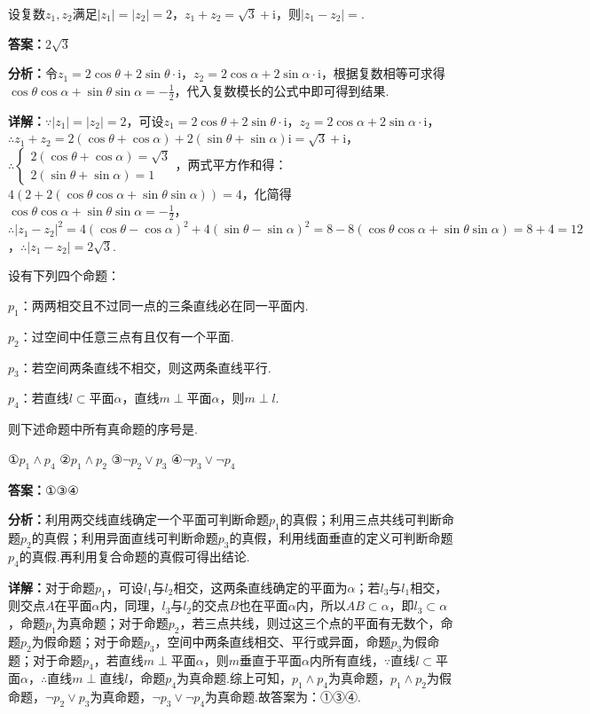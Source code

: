 \begin{question}[points=5]
设复数$z_1,z_2$满足$|z_1|=|z_2|=2$，$z_1+z_2=\sqrt3+\mathrm{i}$，则$|z_1-z_2|=$.
\fillin[{$2\sqrt3$}]
\begin{solution}
\textbf{答案：}$2\sqrt3$

\textbf{分析：}令$z_1=2\cos\theta+2\sin\theta\cdot\mathrm{i}$，$z_2=2\cos\alpha+2\sin\alpha\cdot\mathrm{i}$，根据复数相等可求得$\cos\theta\cos\alpha+\sin\theta\sin\alpha=-\frac12$，代入复数模长的公式中即可得到结果.

\textbf{详解：}$\because|z_1|=|z_2|=2$，可设$z_1=2\cos\theta+2\sin\theta\cdot\mathrm{i}$，$z_2=2\cos\alpha+2\sin\alpha\cdot\mathrm{i}$，$\therefore z_1+z_2=2(\cos\theta+\cos\alpha)+2(\sin\theta+\sin\alpha)\mathrm{i}=\sqrt3+\mathrm{i}$，$\therefore\begin{cases}2(\cos\theta+\cos\alpha)=\sqrt3\\2(\sin\theta+\sin\alpha)=1\end{cases}$，两式平方作和得：$4(2+2(\cos\theta\cos\alpha+\sin\theta\sin\alpha))=4$，化简得$\cos\theta\cos\alpha+\sin\theta\sin\alpha=-\frac12$，$\therefore|z_1-z_2|^2=4(\cos\theta-\cos\alpha)^2+4(\sin\theta-\sin\alpha)^2=8-8(\cos\theta\cos\alpha+\sin\theta\sin\alpha)=8+4=12$，$\therefore|z_1-z_2|=2\sqrt3$.
\end{solution}
\end{question}

\begin{question}[points=5]
设有下列四个命题：

$p_1$：两两相交且不过同一点的三条直线必在同一平面内.

$p_2$：过空间中任意三点有且仅有一个平面.

$p_3$：若空间两条直线不相交，则这两条直线平行.

$p_4$：若直线$l\subset$平面$\alpha$，直线$m\perp$平面$\alpha$，则$m\perp l$.

则下述命题中所有真命题的序号是.

①$p_1\land p_4$ ②$p_1\land p_2$ ③$\lnot p_2\lor p_3$ ④$\lnot p_3\lor\lnot p_4$
\fillin[{$①③④$}]
\begin{solution}
\textbf{答案：}$①③④$

\textbf{分析：}利用两交线直线确定一个平面可判断命题$p_1$的真假；利用三点共线可判断命题$p_2$的真假；利用异面直线可判断命题$p_3$的真假，利用线面垂直的定义可判断命题$p_4$的真假.再利用复合命题的真假可得出结论.

\textbf{详解：}对于命题$p_1$，可设$l_1$与$l_2$相交，这两条直线确定的平面为$\alpha$；若$l_3$与$l_1$相交，则交点$A$在平面$\alpha$内，同理，$l_3$与$l_2$的交点$B$也在平面$\alpha$内，所以$AB\subset\alpha$，即$l_3\subset\alpha$，命题$p_1$为真命题；对于命题$p_2$，若三点共线，则过这三个点的平面有无数个，命题$p_2$为假命题；对于命题$p_3$，空间中两条直线相交、平行或异面，命题$p_3$为假命题；对于命题$p_4$，若直线$m\perp$平面$\alpha$，则$m$垂直于平面$\alpha$内所有直线，$\because$直线$l\subset$平面$\alpha$，$\therefore$直线$m\perp$直线$l$，命题$p_4$为真命题.综上可知，$p_1\land p_4$为真命题，$p_1\land p_2$为假命题，$\lnot p_2\lor p_3$为真命题，$\lnot p_3\lor\lnot p_4$为真命题.故答案为：①③④.
\end{solution}
\end{question}

